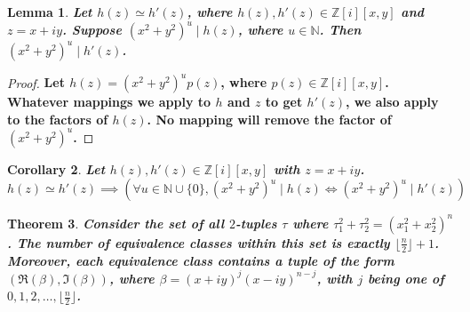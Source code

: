 \documentclass[12pt]{article}
\newtheorem{theorem}{Theorem}[section]
\newtheorem{lemma}[theorem]{Lemma}
\newtheorem{corollary}[theorem]{Corollary}
\theoremstyle{definition}
\newcommand{\divides}{\mid}
\numberwithin{equation}{section}
\begin{document}
\begin{lemma}
\bf Let \( h(z) \simeq h'(z) \), where \( h(z), h'(z) \in \mathbb{Z}[i][x,y] \)
 and \( z = x+ iy \). Suppose \( ( x^2 + y^2 ) ^ u
    \divides h(z) \), where \( u \in \mathbb{N} \). Then \( ( x^2 + y^2 ) ^ u \divides h'(z) \).
\end{lemma}
   
\begin{proof}
\bf
Let \( h(z) = ( x^2 + y^2 ) ^ u  p(z) \), where \( p(z) \in \mathbb{Z} [i][x,y] \). 
Whatever mappings we apply to \(h\) and \(z\)
to get \( h'(z) \), we also apply to the factors of \( h(z) \). 
No mapping will remove the factor of \( ( x^2 + y^2 ) ^ u \).

\end{proof}

\begin{corollary}
\bf
Let \( h(z), h'(z) \in \mathbb{Z}[i][x,y] \) with \( z = x+ iy \).
\[
h(z) \simeq h'(z) 
\implies 
( \forall u \in \mathbb{N} \cup \{ 0 \},  ( x^2 + y^2 ) ^ u \divides h(z)  \iff ( x^2 + y^2 ) ^ u \divides h'(z)  )
\]
\end{corollary}




\begin{theorem}
\bf
Consider the set of all \(2\)-tuples \( \tau \) where 
\(
  \tau_1 ^ 2   +   \tau_2 ^ 2   
= 
\left(  x_1 ^ 2 + x_2 ^ 2  \right) ^ n 
\).
The number of equivalence classes within this set 
is exactly  \( \lfloor \frac{n}{2} \rfloor + 1 \). 
Moreover, each equivalence class contains a tuple
of the form \( ( \Re( \beta ) , \Im( \beta ) ) \),
where \( \beta = (x + iy)^j (x -  iy)^{n-j} \),
with \( j \)
being one of \( 0, 1, 2, \ldots, \lfloor \frac{n}{2} \rfloor \).
\end{theorem}
\end{document}
